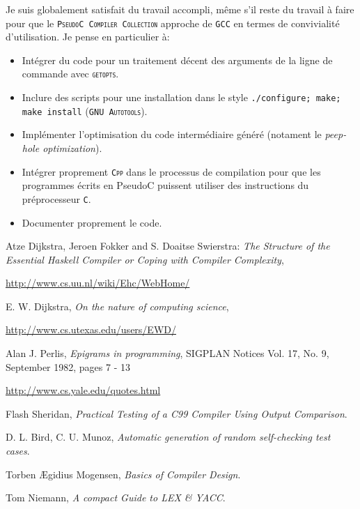 \documentclass[12pt,a4paper,openright]{report}
\let\urlorig\url
\renewcommand{\url}[1]{%
   \begin{otherlanguage}{english}\urlorig{#1}\end{otherlanguage}%
}
\newcommand{\nom}[1]{\textsc{\texttt{#1}}}
\newcommand{\pcc}{\nom{PseudoC Compiler Collection}}
\newcommand{\ce}{\nom{C}}
\begin{document}
    Je suis globalement satisfait du travail accompli, même s'il
    reste du travail à faire pour que le \pcc{} approche de \nom{GCC} en
    termes de convivialité d'utilisation. Je pense en particulier à:

    \begin{itemize}
        \item Intégrer du code pour un traitement décent des
        arguments de la ligne de commande avec \nom{getopts}.
        \item Inclure des scripts pour une installation dans le style
        \texttt{./configure; make; make install} (\nom{GNU Autotools}).
        \item Implémenter l'optimisation du code intermédiaire généré
        (notament le \emph{peep-hole optimization}).
        \item Intégrer proprement \nom{Cpp} dans le processus de
        compilation pour que les programmes écrits en PseudoC puissent
        utiliser des instructions du préprocesseur \ce.
        \item Documenter proprement le code.
    \end{itemize}

\begin{thebibliography}{99}
     Atze Dijkstra, Jeroen Fokker and S. Doaitse Swierstra:
    \emph{The Structure of the Essential Haskell Compiler or Coping with
    Compiler Complexity}, \\
    \url{http://www.cs.uu.nl/wiki/Ehc/WebHome/}

     E. W. Dijkstra, \emph{On the nature of computing
    science}, \\
    \url{http://www.cs.utexas.edu/users/EWD/}

     Alan J. Perlis, \emph{Epigrams in programming}, 
    SIGPLAN Notices Vol. 17, No. 9, September 1982, pages 7 - 13
    \url{http://www.cs.yale.edu/quotes.html}

     Flash Sheridan, \emph{Practical Testing of a C99
    Compiler Using Output Comparison}.

     D. L. Bird, C. U. Munoz, \emph{Automatic generation
    of random self-checking test cases}.

     Torben Ægidius Mogensen, \emph{Basics of Compiler
    Design}.

     Tom Niemann, \emph{A compact Guide to LEX \& YACC}.

\end{thebibliography}
\end{document}
